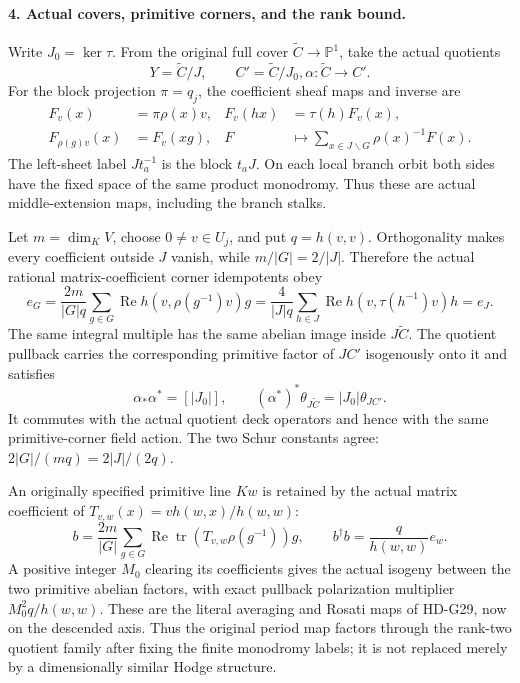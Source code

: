 \paragraph{4. Actual covers, primitive corners, and the rank bound.}
Write \(J_0=\ker\tau\). From the original full cover
\(\widetilde C\to\mathbb P^1\), take the actual quotients
\[
       Y=\widetilde C/J,\qquad C'=\widetilde C/J_0,
                    \alpha:\widetilde C\to C'.             \tag{G30.14}
\]
For the block projection \(\pi=q_j\), the coefficient
sheaf maps and inverse are
\[
 \begin{aligned}
 F_v(x)&=\pi\rho(x)v,& F_v(hx)&=\tau(h)F_v(x),\\
 F_{\rho(g)v}(x)&=F_v(xg),&
 F&\longmapsto\sum_{x\in J\backslash G}\rho(x)^{-1}F(x).
 \end{aligned}                                              \tag{G30.15}
\]
The left-sheet label \(Jt_a^{-1}\) is the block \(t_aJ\).
On each local branch orbit both sides have the fixed space
of the same product monodromy. Thus these are actual
middle-extension maps, including the branch stalks.

Let \(m=\dim_K V\), choose \(0\ne v\in U_j\), and
put \(q=h(v,v)\). Orthogonality makes every coefficient
outside \(J\) vanish, while \(m/|G|=2/|J|\). Therefore
the actual rational matrix-coefficient corner idempotents obey
\[
 e_G=\frac{2m}{|G|q}\sum_{g\in G}
       \operatorname{Re}h(v,\rho(g^{-1})v)g
     =\frac4{|J|q}\sum_{h\in J}
       \operatorname{Re}h(v,\tau(h^{-1})v)h=e_J.
                                                               \tag{G30.16}
\]
The same integral multiple has the same abelian image inside
\(J\widetilde C\). The quotient pullback carries the
corresponding primitive factor of \(JC'\) isogenously onto
it and satisfies
\[
 \alpha_*\alpha^*=[|J_0|],\qquad
   (\alpha^*)^*\theta_{J\widetilde C}=|J_0|\theta_{JC'}.
                                                               \tag{G30.17}
\]
It commutes with the actual quotient deck operators and hence
with the same primitive-corner field action. The two Schur
constants agree: \(2|G|/(mq)=2|J|/(2q)\).

An originally specified primitive line \(Kw\) is retained
by the actual matrix coefficient of
\(T_{v,w}(x)=v h(w,x)/h(w,w)\):
\[
 b=\frac{2m}{|G|}\sum_{g\in G}
        \operatorname{Re}\operatorname{tr}
                (T_{v,w}\rho(g^{-1}))g,\qquad
 b^\dagger b=\frac q{h(w,w)}e_w.                            \tag{G30.18}
\]
A positive integer \(M_0\) clearing its coefficients gives
the actual isogeny between the two primitive abelian factors,
with exact pullback polarization multiplier
\(M_0^2q/h(w,w)\). These are the literal averaging and
Rosati maps of HD-G29, now on the descended axis. Thus the
original period map factors through the rank-two quotient
family after fixing the finite monodromy labels; it is not
replaced merely by a dimensionally similar Hodge structure.

